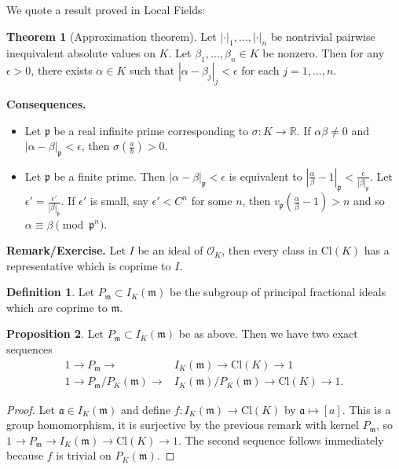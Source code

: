 \documentclass{article}
\theoremstyle{definition}
\newtheorem{theorem}{Theorem}[section]
\newtheorem{prop}[theorem]{Proposition}
\newtheorem{defn}{Definition}[section]
\begin{document}
\vspace{1mm}
 
We quote a result proved in Local Fields:
\begin{theorem}[Approximation theorem]
    Let $|\cdot|_1,\ldots,|\cdot|_n$ be nontrivial pairwise inequivalent absolute values on $K$. Let $\beta_1,\ldots,\beta_n \in K$ be nonzero. Then for any $\epsilon>0$, there exists $\alpha \in K$ such that $|\alpha-\beta_j|_j <\epsilon$ for each $j = 1,\ldots,n$.
\end{theorem}
\textbf{Consequences.} 
\begin{itemize}
    \item Let $\mathfrak{p}$ be a real infinite prime corresponding to $\sigma : K \to \mathbb{R}$. If $\alpha \beta \neq 0$ and $|\alpha-\beta|_{\mathfrak{p}}<\epsilon$, then $\sigma \left(\frac{a}{b}\right) > 0$.
    \item Let $\mathfrak{p}$ be a finite prime. Then $|\alpha-\beta|_{\mathfrak{p}}<\epsilon$ is equivalent to $\left|\frac{\alpha}{\beta}-1 \right|_{\mathfrak{p}} < \frac{\epsilon}{|\beta|_{\mathfrak{p}}}$. Let $\epsilon' = \frac{\epsilon'}{|\beta|_{\mathfrak{p}}}$. If $\epsilon'$ is small, say $\epsilon' < C^n$ for some $n$, then $v_{\mathfrak{p}}\left(\frac{\alpha}{\beta}-1\right) > n$ and so $\alpha \equiv  \beta \pmod{\mathfrak{p}^n}$.
\end{itemize}
\textbf{Remark/Exercise.} Let $I$ be an ideal of $\mathcal{O}_K$, then every class in $\text{Cl}(K)$ has a representative which is coprime to $I$.
\begin{defn}
    Let $P_{\mathfrak{m}} \subset I_K(\mathfrak{m})$ be the subgroup of principal fractional ideals which are coprime to $\mathfrak{m}$.
\end{defn}
\begin{prop}\label{prop1.5}
    Let $P_{\mathfrak{m}} \subset I_K(\mathfrak{m})$ be as above. Then we have two exact sequences
    \begin{align*}
        1 \to P_{\mathfrak{m}} \to &I_K(\mathfrak{m}) \to \text{Cl}(K) \to 1\\
        1 \to P_{\mathfrak{m}}/P_K(\mathfrak{m}) \to &I_K(\mathfrak{m})/P_K(\mathfrak{m}) \to \text{Cl}(K) \to 1.
    \end{align*}
\end{prop}
\begin{proof}
    Let $\mathfrak{a} \in I_K(\mathfrak{m})$ and define $f: I_K(\mathfrak{m}) \to \text{Cl}(K)$ by $\mathfrak{a}\mapsto [a]$. This is a group homomorphism, it is surjective by the previous remark with kernel $P_{\mathfrak{m}}$, so $1 \to P_{\mathfrak{m}} \to I_K(\mathfrak{m}) \to \text{Cl}(K) \to 1$. The second sequence follows immediately because $f$ is trivial on $P_K(\mathfrak{m})$.
\end{proof}
\end{document}
